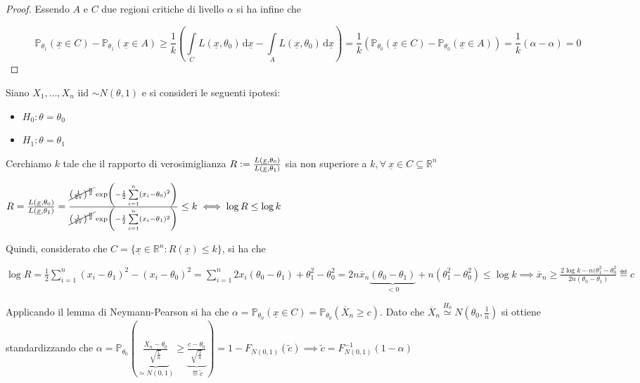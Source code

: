 \documentclass[hidelinks, 10pt]{report}
\begin{document}
\begin{proof}
Essendo $ A $ e $ C $ due regioni critiche di livello $ \alpha $ si ha infine che

\begin{dmath*}
\mathbb{P}_{\theta_{1}} (\underline{x} \in C) - \mathbb{P}_{\theta_{1}} (\underline{x} \in A) \ge \frac{1}{k} \left( \int\limits_{C} L(\underline{x}, \theta_{0}) \, \mathrm{d}\underline{x} - \int\limits_{A} L(\underline{x}, \theta_{0}) \, \mathrm{d}\underline{x} \right) =  \frac{1}{k} \left( \mathbb{P}_{\theta_{0}} (\underline{x} \in C) - \mathbb{P}_{\theta_{0}} (\underline{x} \in A) \right) = \frac{1}{k} (\alpha - \alpha) = 0 
\end{dmath*}
\end{proof}

\begin{es}
Siano $ X_{1}, \dotsc, X_{n} $ iid $ \sim N(\theta, 1) $ e si consideri le seguenti ipotesi:
\begin{itemize}
\item $ H_{0}: \theta = \theta_{0} $
\item $ H_{1}: \theta = \theta_{1} $
\end{itemize}

Cerchiamo $ k $ tale che il rapporto di verosimiglianza $ R \vcentcolon= \frac{L(\underline{x}, \theta_{0})}{L(\underline{x}, \theta_{1})} $ sia non superiore a $ k, \forall\ \underline{x} \in C \subseteq \mathbb{R}^{n} $

$ R = \frac{L(\underline{x}, \theta_{0})}{L(\underline{x}, \theta_{1})} = \frac{\cancel{\left( \frac{1}{2 \pi} \right)^{\frac{n}{2}}} \exp \left( - \frac{1}{2} \sum\limits_{i = 1}^{n} (x_{i} - \theta_{0})^{2} \right)}{\cancel{\left( \frac{1}{2 \pi} \right)^{\frac{n}{2}}} \exp \left( - \frac{1}{2} \sum\limits_{i = 1}^{n} (x_{i} - \theta_{1})^{2} \right)} \le k \iff \log R \le \log k $

Quindi, considerato che $ C = \{ \underline{x} \in \mathbb{R}^{n} : R(\underline{x}) \le k \} $, si ha che

$ \log R = \frac{1}{2} \sum\limits_{i = 1}^{n} (x_{i} - \theta_{1})^{2} - (x_{i} - \theta_{0})^{2} = \sum\limits_{i = 1}^{n} 2 x_{i} (\theta_{0} - \theta_{1}) + \theta_{1}^{2} - \theta_{0}^{2} = 2 n \overline{x}_{n} \underbrace{(\theta_{0} - \theta_{1})}_{< 0} + n (\theta_{1}^{2} - \theta_{0}^{2}) \le \log k \implies \overline{x}_{n} \ge \frac{2 \log k - n(\theta_{1}^{2} - \theta_{0}^{2}}{2 n (\theta_{0} - \theta_{1})} \eqdef c $

Applicando il lemma di Neymann-Pearson si ha che $ \alpha = \mathbb{P}_{\theta_{0}} (\underline{x} \in C) = \mathbb{P}_{\theta_{0}} (\overline{X}_{n} \ge c) $. Dato che $ \overline{X}_{n} \stackrel{H_{0}}{\simeq} N \left( \theta_{0}, \frac{1}{n} \right) $ si ottiene standardizzando che $ \alpha = \mathbb{P}_{\theta_{0}} \left( \underbrace{\frac{\overline{X}_{n} - \theta_{0}}{\sqrt{\frac{1}{n}}}}_{\simeq N(0, 1)} \ge \underbrace{\frac{c - \theta_{0}}{\sqrt{\frac{1}{n}}}}_{\eqdef \tilde{c}} \right) = 1 - F_{N(0,1)} (\tilde{c}) \implies \tilde{c} = F_{N(0,1)}^{-1} (1 - \alpha) $
\end{es}
\end{document}
